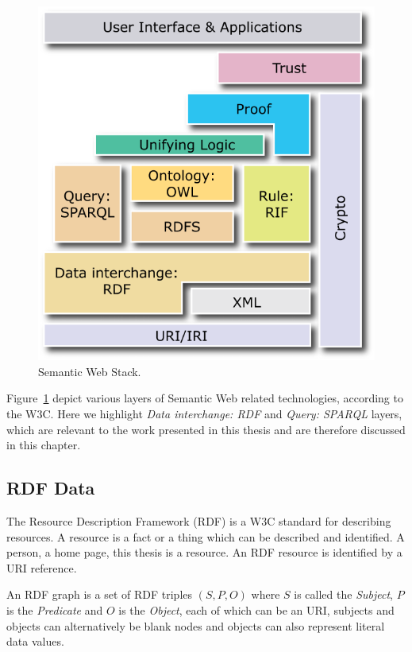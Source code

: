 \begin{figure}
\centering
\includegraphics[width=0.7\columnwidth]{images/2_preliminaries/sw-layer-cake-2007.png}
 \caption[Semantic Web Stack]{Semantic Web Stack\footnotemark.}
\label{fig:preliminaries-sw-layer-cake}
\end{figure}


Figure~\ref{fig:preliminaries-sw-layer-cake} depict various layers of Semantic Web related technologies, according to the \gls{W3C}.
Here we highlight \textit{Data interchange: \gls{RDF}} and \textit{Query: \gls{SPARQL}} layers, which are relevant to the work presented in this thesis and are therefore discussed in this chapter.


\subsection{RDF Data}

The Resource Description Framework (\gls{RDF}) is a \gls{W3C} standard for describing resources.
A resource is a fact or a thing which can be described and identified. 
A person, a home page, this thesis is a resource. 
An RDF resource is identified by a \gls{URI} reference.

An RDF graph is a set of RDF triples $(S,P,O)$ where $S$ is called the \emph{Subject}, $P$ is the \emph{Predicate} and $O$ is the \emph{Object}, each of which can be an \gls{URI}, subjects and objects can alternatively be blank nodes and objects can also represent literal data values.

